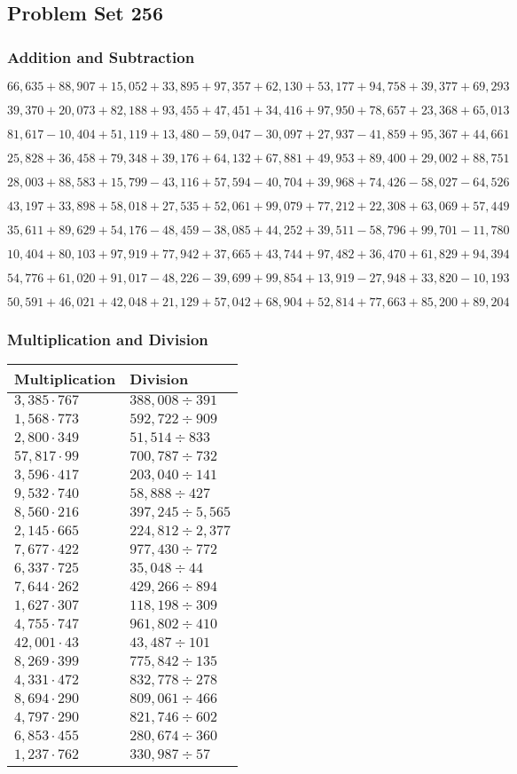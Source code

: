 \hypertarget{problem-set-256}{%
\subsection{Problem Set 256}\label{problem-set-256}}

\hypertarget{addition-and-subtraction}{%
\subsubsection{Addition and
Subtraction}\label{addition-and-subtraction}}

\(66,635+88,907+15,052+33,895+97,357+62,130+53,177+94,758+39,377+69,293\)

\(39,370+20,073+82,188+93,455+47,451+34,416+97,950+78,657+23,368+65,013\)

\(81,617-10,404+51,119+13,480-59,047-30,097+27,937-41,859+95,367+44,661\)

\(25,828+36,458+79,348+39,176+64,132+67,881+49,953+89,400+29,002+88,751\)

\(28,003+88,583+15,799-43,116+57,594-40,704+39,968+74,426-58,027-64,526\)

\(43,197+33,898+58,018+27,535+52,061+99,079+77,212+22,308+63,069+57,449\)

\(35,611+89,629+54,176-48,459-38,085+44,252+39,511-58,796+99,701-11,780\)

\(10,404+80,103+97,919+77,942+37,665+43,744+97,482+36,470+61,829+94,394\)

\(54,776+61,020+91,017-48,226-39,699+99,854+13,919-27,948+33,820-10,193\)

\(50,591+46,021+42,048+21,129+57,042+68,904+52,814+77,663+85,200+89,204\)

\hypertarget{multiplication-and-division}{%
\subsubsection{Multiplication and
Division}\label{multiplication-and-division}}

\begin{longtable}[]{@{}ll@{}}
\toprule
Multiplication & Division\tabularnewline
\midrule
\endhead
\(3,385\cdot767\) & \(388,008÷391\)\tabularnewline
\(1,568\cdot773\) & \(592,722÷909\)\tabularnewline
\(2,800\cdot349\) & \(51,514÷833\)\tabularnewline
\(57,817\cdot99\) & \(700,787÷732\)\tabularnewline
\(3,596\cdot417\) & \(203,040÷141\)\tabularnewline
\(9,532\cdot740\) & \(58,888÷427\)\tabularnewline
\(8,560\cdot216\) & \(397,245÷5,565\)\tabularnewline
\(2,145\cdot665\) & \(224,812÷2,377\)\tabularnewline
\(7,677\cdot422\) & \(977,430÷772\)\tabularnewline
\(6,337\cdot725\) & \(35,048÷44\)\tabularnewline
\(7,644\cdot262\) & \(429,266÷894\)\tabularnewline
\(1,627\cdot307\) & \(118,198÷309\)\tabularnewline
\(4,755\cdot747\) & \(961,802÷410\)\tabularnewline
\(42,001\cdot43\) & \(43,487÷101\)\tabularnewline
\(8,269\cdot399\) & \(775,842÷135\)\tabularnewline
\(4,331\cdot472\) & \(832,778÷278\)\tabularnewline
\(8,694\cdot290\) & \(809,061÷466\)\tabularnewline
\(4,797\cdot290\) & \(821,746÷602\)\tabularnewline
\(6,853\cdot455\) & \(280,674÷360\)\tabularnewline
\(1,237\cdot762\) & \(330,987÷57\)\tabularnewline
\bottomrule
\end{longtable}
